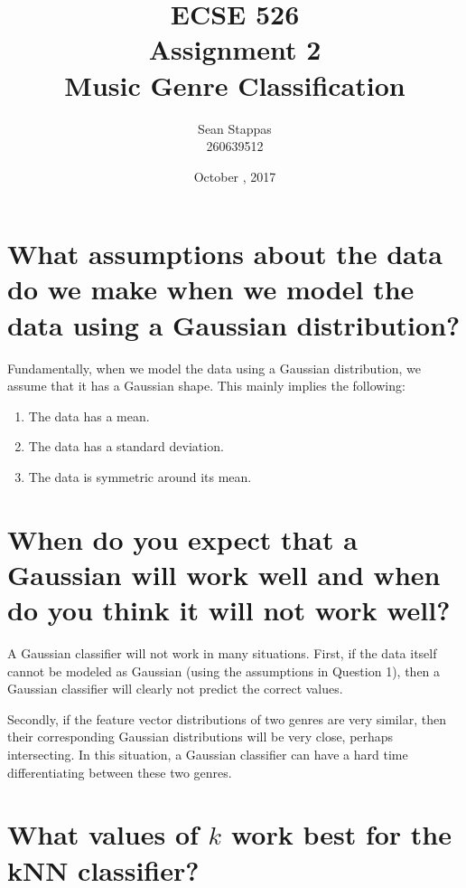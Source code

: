 \documentclass[a4paper,titlepage]{article}
\title{
	\textbf{ECSE 526 \\ Assignment 2}
	\\ \large Music Genre Classification
}
\author{Sean Stappas \\ 260639512}
\date{October \nth{19}, 2017}
\begin{document}
	\sloppy
	\maketitle
	\twocolumn
	
	\section{What assumptions about the data do we make when we model the data using a Gaussian distribution?}
	
	Fundamentally, when we model the data using a Gaussian distribution, we assume that it has a Gaussian shape. This mainly implies the following:
	
	\begin{enumerate}
		\item The data has a mean.
		\item The data has a standard deviation.
		\item The data is symmetric around its mean.
	\end{enumerate}
	
	
	\section{When do you expect that a Gaussian will work well and when do you think it will not work well?}
	
	A Gaussian classifier will not work in many situations. First, if the data itself cannot be modeled as Gaussian (using the assumptions in Question 1), then a Gaussian classifier will clearly not predict the correct values.
	
	Secondly, if the feature vector distributions of two genres are very similar, then their corresponding Gaussian distributions will be very close, perhaps intersecting. In this situation, a Gaussian classifier can have a hard time differentiating between these two genres.
	
	\section{What values of $k$ work best for the kNN classifier?}
	
\end{document}
